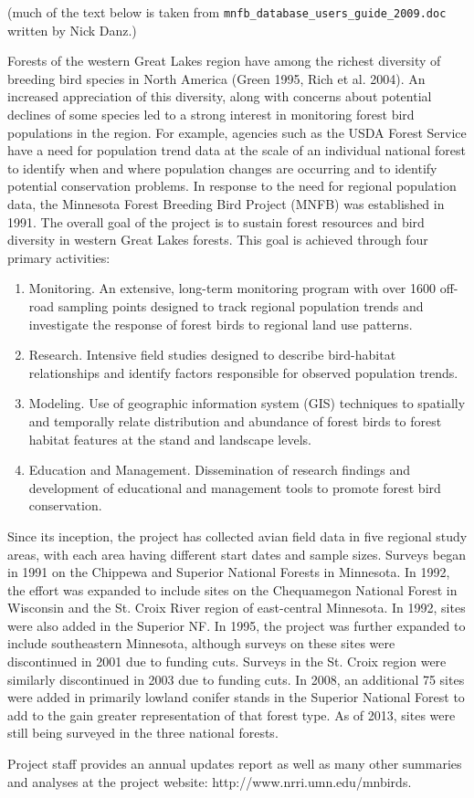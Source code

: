 (much of the text below is taken from {\tt mnfb\_database\_users\_guide\_2009.doc} written by Nick Danz.)

Forests of the western Great Lakes region have among the richest diversity of breeding bird species in North America (Green 1995, Rich et al. 2004).  An increased appreciation of this diversity, along with concerns about potential declines of some species led to a strong interest in monitoring forest bird populations in the region.  For example, agencies such as the USDA Forest Service have a need for population trend data at the scale of an individual national forest to identify when and where population changes are occurring and to identify potential conservation problems.  In response to the need for regional population data, the Minnesota Forest Breeding Bird Project (MNFB) was established in 1991.  The overall goal of the project is to sustain forest resources and bird diversity in western Great Lakes forests.  This goal is achieved through four primary activities:

\begin{enumerate}
\item	Monitoring. An extensive, long-term monitoring program with over 1600 off-road sampling points designed to track regional population trends and investigate the response of forest birds to regional land use patterns.
\item	Research. Intensive field studies designed to describe bird-habitat relationships and identify factors responsible for observed population trends.
\item	Modeling. Use of geographic information system (GIS) techniques to spatially and temporally relate distribution and abundance of forest birds to forest habitat features at the stand and landscape levels.
\item	Education and Management. Dissemination of research findings and development of educational and management tools to promote forest bird conservation.
\end{enumerate}

Since its inception, the project has collected avian field data in five regional study areas, with each area having different start dates and sample sizes.  Surveys began in 1991 on the Chippewa and Superior National Forests in Minnesota.  In 1992, the effort was expanded to include sites on the Chequamegon National Forest in Wisconsin and the St. Croix River region of east-central Minnesota.  In 1992, sites were also added in the Superior NF.  In 1995, the project was further expanded to include southeastern Minnesota, although surveys on these sites were discontinued in 2001 due to funding cuts.  Surveys in the St. Croix region were similarly discontinued in 2003 due to funding cuts.  In 2008, an additional 75 sites were added in primarily lowland conifer stands in the Superior National Forest to add to the gain greater representation of that forest type.  As of 2013, sites were still being surveyed in the three national forests.

Project staff provides an annual updates report as well as many other summaries and analyses at the project website: http://www.nrri.umn.edu/mnbirds.
